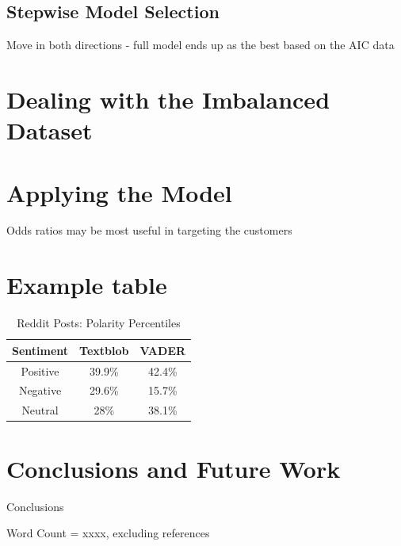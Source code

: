 \documentclass[9pt,technote]{IEEEtran}
\begin{document}
\subsection{Stepwise Model Selection}

Move in both directions - full model ends up as the best based on the AIC data 

\section{Dealing with the Imbalanced Dataset}
\label{sec:imbalance}

\section{Applying the Model}

Odds ratios may be most useful in targeting the customers

\section{Example table} 

\begin{table}[htbp]
\caption{Reddit Posts: Polarity Percentiles }
\begin{center}
\begin{tabular}{|c|c|c|}
\hline
\textbf{Sentiment}&{\textbf{Textblob}}&{\textbf{VADER}} \\
\hline
Positive& 39.9\%&42.4\%\\
\hline
Negative& 29.6\%&15.7\%\\
\hline
Neutral& 28\%&38.1\%\\
\hline
\end{tabular}
\label{tab2}
\end{center}
\end{table}

\section{Conclusions and Future Work}

Conclusions

Word Count = xxxx, excluding references



\end{document}
